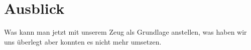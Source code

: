 \chapter{Ausblick}

Was kann man jetzt mit unserem Zeug als Grundlage anstellen, was haben wir uns überlegt aber konnten es nicht mehr umsetzen.

  

 
 
 
 
 
 
 
 